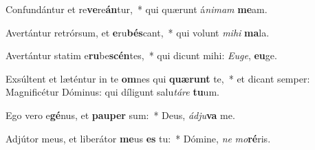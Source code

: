\item Confundántur et re\textbf{ve}re\textbf{án}tur,~* qui quærunt á\textit{ni}\textit{mam} \textbf{me}am.
\item Avertántur retrórsum, et \textbf{e}ru\textbf{bés}cant,~* qui volunt \textit{mi}\textit{hi} \textbf{ma}la.
\item Avertántur statim e\textbf{ru}be\textbf{scén}tes,~* qui dicunt mihi: \textit{Eu}\textit{ge}, \textbf{eu}ge.
\item Exsúltent et læténtur in te \textbf{om}nes qui \textbf{quæ}\textbf{runt} te,~* et dicant semper: Magnificétur Dóminus: qui díligunt salu\textit{tá}\textit{re} \textbf{tu}um.
\item Ego vero e\textbf{gé}nus, et \textbf{pau}\textbf{per} sum:~* Deus, \textit{ád}\textit{ju}\textbf{va} me.
\item Adjútor meus, et liberátor \textbf{me}us \textbf{es} tu:~* Dómine, \textit{ne} \textit{mo}\textbf{ré}ris.
